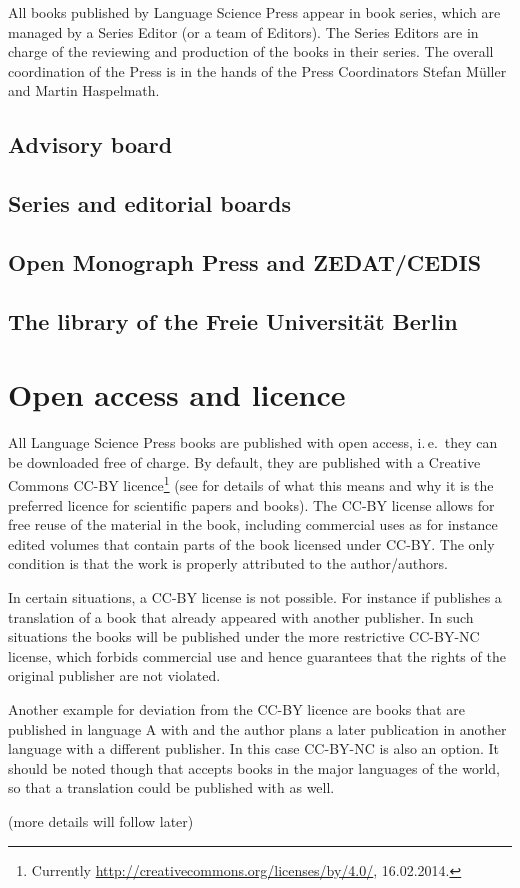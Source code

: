 All books published by Language Science Press appear in book series, which are managed by a Series
Editor (or a team of Editors). The Series Editors are in charge of the reviewing and production of
the books in their series. The overall coordination of the Press is in the hands of the Press
Coordinators Stefan Müller and Martin Haspelmath.

\subsection{Advisory board}



\subsection{Series and editorial boards}

\subsection{Open Monograph Press and ZEDAT/CEDIS}

\subsection{The library of the Freie Universität Berlin}


\section{Open access and licence}

All Language Science Press books are published with open access, i.\,e.\ they can be downloaded free of
charge. By default, they are published with a Creative Commons CC-BY licence\footnote{
  Currently \url{http://creativecommons.org/licenses/by/4.0/}, 16.02.2014.
} (see  for details
of what this means and why it is the preferred licence for scientific papers and books). The CC-BY
license allows for free reuse of the material in the book, including commercial uses as for instance
edited volumes that contain parts of the book licensed under CC-BY. The only condition is that the
work is properly attributed to the author/authors.

In certain situations, a CC-BY license is not possible. For instance if \lsp publishes a translation of a
book that already appeared with another publisher. In such situations the books will be published
under the more restrictive CC-BY-NC license, which forbids commercial use and hence guarantees that
the rights of the original publisher are not violated.

Another example for deviation from the CC-BY licence are books that are published in language A with
\lsp and the author plans a later publication in another language with a different publisher. In
this case CC-BY-NC is also an option. It should be noted though that \lsp accepts books in the major
languages of the world, so that a translation could be published with \lsp as well.

(more details will follow later)
